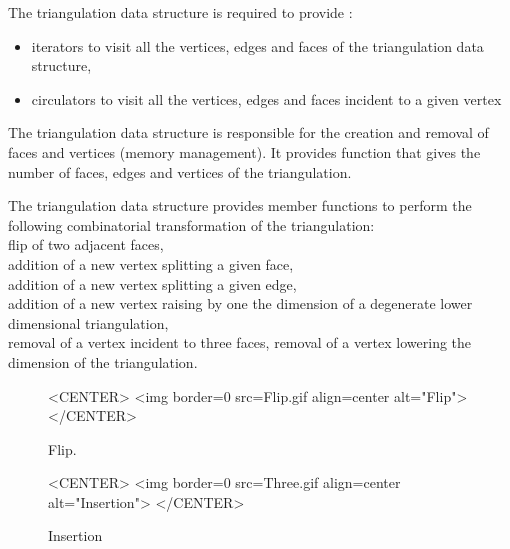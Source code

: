 The triangulation data structure 
is required to provide :
\begin{itemize}
\item
iterators to visit all the vertices, edges and faces
of the triangulation data structure,
\item
circulators to visit all the vertices, edges and faces
incident to a given vertex
\end{itemize}


The triangulation data structure is responsible 
for the creation and removal of faces and vertices 
(memory management).
It provides function that gives the number of faces, edges and
vertices
of the triangulation.

The triangulation data structure provides member functions
to perform the following  combinatorial transformation of the triangulation:\\
flip of two adjacent faces, \\
addition  of a new vertex splitting a given face,\\
addition  of a new vertex splitting a given edge,\\
addition of a new vertex raising by one the dimension of a degenerate
lower dimensional triangulation, \\
removal of a vertex incident to three faces,
removal of a vertex lowering the dimension of the triangulation.\\


\begin{figure}
\begin{ccTexOnly}
\begin{center} %

\end{center}
\end{ccTexOnly} 
\caption{Flip. \label{I1_fig_flip_bis}}

\begin{ccHtmlOnly}
<CENTER>
<img border=0 src=Flip.gif align=center alt="Flip">
</CENTER>
\end{ccHtmlOnly} 
\end{figure}



\begin{figure}
\begin{ccTexOnly}
\begin{center}  \end{center}
\caption{Insertion}
\end{ccTexOnly} 

\begin{ccHtmlOnly}
<CENTER>
<img border=0 src=Three.gif align=center alt="Insertion">
</CENTER>
\end{ccHtmlOnly} 
\end{figure}



